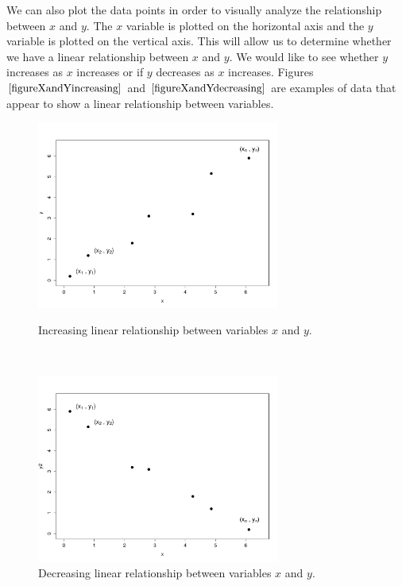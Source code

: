 We can also plot the data points in order to 
visually analyze the relationship between $x$ and $y$.
The $x$ variable is plotted on the horizontal axis
and the $y$ variable is plotted on the vertical axis.
This will allow us to determine whether we have a
linear relationship between $x$ and $y$.
We would like to see whether $y$ increases as $x$ increases
or if $y$ decreases as $x$ increases.
Figures $\ref{figureXandYincreasing}$
and $\ref{figureXandYdecreasing}$
are examples of data that appear to show a linear
relationship between variables.

\begin{figure}[H]
\begin{minipage}[c]{0.48\textwidth}
	\includegraphics[width=8.0cm]{Section8/XandYplotIncreasing.pdf}
	\vspace{-0.25cm}
	\caption{Increasing linear relationship between variables $x$ and $y$.}
	\label{figureXandYincreasing}
\end{minipage}
~~
\begin{minipage}[c]{0.48\textwidth}
	\includegraphics[width=8.0cm]{Section8/XandYplotDecreasing.pdf}
	\vspace{-0.25cm}
	\caption{Decreasing linear relationship between variables $x$ and $y$.}
	\label{figureXandYdecreasing}
\end{minipage}
\end{figure}
\hfill

